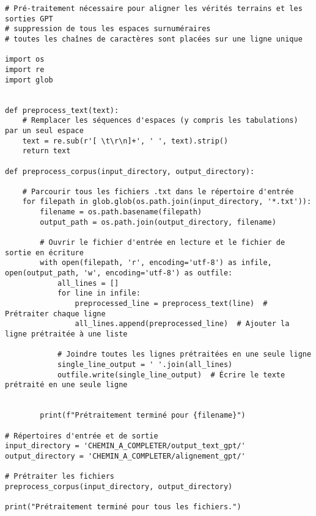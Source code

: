 \begin{verbatim}
# Pré-traitement nécessaire pour aligner les vérités terrains et les sorties GPT 
# suppression de tous les espaces surnuméraires
# toutes les chaînes de caractères sont placées sur une ligne unique

import os
import re
import glob


def preprocess_text(text):
    # Remplacer les séquences d'espaces (y compris les tabulations) par un seul espace
    text = re.sub(r'[ \t\r\n]+', ' ', text).strip()
    return text

def preprocess_corpus(input_directory, output_directory):    
    
    # Parcourir tous les fichiers .txt dans le répertoire d'entrée
    for filepath in glob.glob(os.path.join(input_directory, '*.txt')):
        filename = os.path.basename(filepath)
        output_path = os.path.join(output_directory, filename)

        # Ouvrir le fichier d'entrée en lecture et le fichier de sortie en écriture
        with open(filepath, 'r', encoding='utf-8') as infile, open(output_path, 'w', encoding='utf-8') as outfile:
            all_lines = []
            for line in infile:
                preprocessed_line = preprocess_text(line)  # Prétraiter chaque ligne
                all_lines.append(preprocessed_line)  # Ajouter la ligne prétraitée à une liste
            
            # Joindre toutes les lignes prétraitées en une seule ligne
            single_line_output = ' '.join(all_lines)
            outfile.write(single_line_output)  # Écrire le texte prétraité en une seule ligne
        
        
        print(f"Prétraitement terminé pour {filename}")

# Répertoires d'entrée et de sortie
input_directory = 'CHEMIN_A_COMPLETER/output_text_gpt/'
output_directory = 'CHEMIN_A_COMPLETER/alignement_gpt/'

# Prétraiter les fichiers
preprocess_corpus(input_directory, output_directory)

print("Prétraitement terminé pour tous les fichiers.")
\end{verbatim}